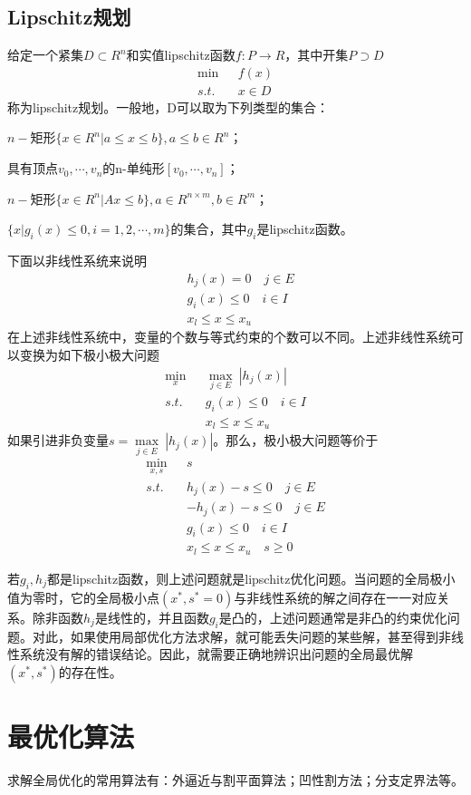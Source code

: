     \subsection{Lipschitz规划}
        \par
        给定一个紧集$D\subset R^n$和实值lipschitz函数$f:P\to R$，其中开集$P \supset D$
        \begin{align*}
        \mathop{\min}\  &f(x)\\
        s.t.\quad & x \in D
        \end{align*}
        称为lipschitz规划。一般地，D可以取为下列类型的集合：
        \par
        $n-$矩形$\{x\in R^n|a\leqslant x\leqslant b\},a\leqslant b\in R^n$；
        \par
        具有顶点$v_0,\cdots,v_n$的n-单纯形$[v_0,\cdots,v_n]$；
        \par
        $n-$矩形$\{x\in R^n|Ax\leqslant b\},a\in  R^{n\times m},b\in R^m$；
        \par
        $\{x|g_i(x)\leqslant 0,i=1,2,\cdots,m\}$的集合，其中$g_i$是lipschitz函数。
        \par
        下面以非线性系统来说明
        \begin{align*}
        &h_j(x)=0\quad j\in E\\
        & g_i(x)\leqslant 0\quad i\in I\\
        & x_l\leqslant x\leqslant x_u
        \end{align*}
        在上述非线性系统中，变量的个数与等式约束的个数可以不同。上述非线性系统可以变换为如下极小极大问题
        \begin{align*}
        \mathop{\min}\limits_{x}\ &\mathop{\max}\limits_{j\in E}\ |h_j(x)|\\
        s.t.\quad & g_i(x)\leqslant 0\quad i\in I\\
        &x_l\leqslant x\leqslant x_u
        \end{align*}
        如果引进非负变量$s=\mathop{\max}\limits_{j\in E}\  |h_j(x)|$。那么，极小极大问题等价于
        \begin{align*}
        \mathop{\min}\limits_{x,s}\  &s\\
        s.t.\quad & h_j(x)-s\leqslant 0\quad j\in E\\
        &-h_j(x)-s\leqslant 0\quad j\in E\\
        &g_i(x)\leqslant 0\quad i\in I\\
        &x_l\leqslant x\leqslant x_u\quad s\geqslant 0
        \end{align*}
        \par
        若$g_i,h_j$都是lipschitz函数，则上述问题就是lipschitz优化问题。当问题的全局极小值为零时，它的全局极小点$(x^*,s^*=0)$与非线性系统的解之间存在一一对应关系。除非函数$h_j$是线性的，并且函数$g_i$是凸的，上述问题通常是非凸的约束优化问题。对此，如果使用局部优化方法求解，就可能丢失问题的某些解，甚至得到非线性系统没有解的错误结论。因此，就需要正确地辨识出问题的全局最优解$(x^*,s^*)$的存在性。
\section{最优化算法}
        求解全局优化的常用算法有：外逼近与割平面算法；凹性割方法；分支定界法等。


